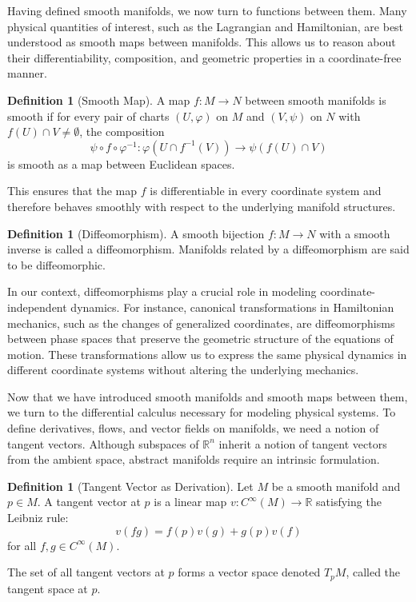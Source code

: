 \documentclass{article}
\theoremstyle{plain}
\theoremstyle{definition}
\newtheorem{definition}[theorem]{Definition}
\theoremstyle{remark}
\newcommand{\R}{\mathbb{R}}
\begin{document}
Having defined smooth manifolds, we now turn to functions between them. Many physical quantities of interest, such as the Lagrangian and Hamiltonian, are best understood as smooth maps between manifolds. This allows us to reason about their differentiability, composition, and geometric properties in a coordinate-free manner.

\begin{definition}[Smooth Map]
A map $f: M \to N$ between smooth manifolds is smooth if for every pair of charts $(U, \varphi)$ on $M$ and $(V, \psi)$ on $N$ with $f(U) \cap V \neq \emptyset$, the composition
\[\psi \circ f \circ \varphi^{-1}: \varphi(U \cap f^{-1}(V)) \to \psi(f(U) \cap V)\]
is smooth as a map between Euclidean spaces.
\end{definition}
This ensures that the map $f$ is differentiable in every coordinate system and therefore behaves smoothly with respect to the underlying manifold structures.
\begin{definition}[Diffeomorphism]
A smooth bijection $f: M \to N$ with a smooth inverse is called a diffeomorphism. Manifolds related by a diffeomorphism are said to be diffeomorphic.
\end{definition}

In our context, diffeomorphisms play a crucial role in modeling coordinate-independent dynamics. For instance, canonical transformations in Hamiltonian mechanics, such as the changes of generalized coordinates, are diffeomorphisms between phase spaces that preserve the geometric structure of the equations of motion. These transformations allow us to express the same physical dynamics in different coordinate systems without altering the underlying mechanics.

Now that we have introduced smooth manifolds and smooth maps between them, we turn to the differential calculus necessary for modeling physical systems. To define derivatives, flows, and vector fields on manifolds, we need a notion of tangent vectors. Although subspaces of $\R^n$ inherit a notion of tangent vectors from the ambient space, abstract manifolds require an intrinsic formulation.
\begin{definition}[Tangent Vector as Derivation]
Let $M$ be a smooth manifold and $p \in M$. A tangent vector at $p$ is a linear map $v: C^\infty(M) \to \R$ satisfying the Leibniz rule:
\[v(fg) = f(p)v(g) + g(p)v(f)\]
for all $f, g \in C^\infty(M)$.

The set of all tangent vectors at $p$ forms a vector space denoted $T_p M$, called the tangent space at $p$.
\end{definition}
\end{document}
